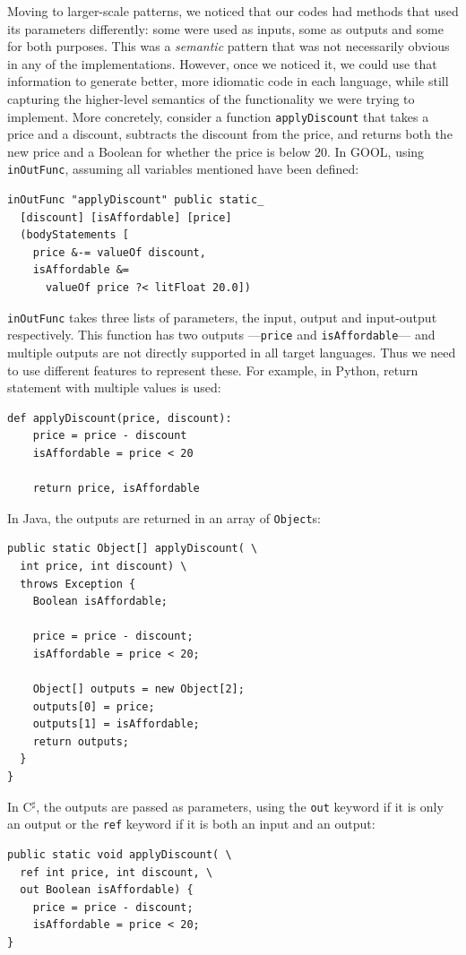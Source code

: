 \documentclass[sigplan,review,anonymous,prologue,dvipsnames]{acmart}
\newcommand{\Csharp}{C$^{\sharp}$}
\begin{document}
Moving to larger-scale patterns, we noticed that our codes had methods that
used its parameters differently: some were used as inputs, some as outputs
and some for both purposes.  This was a \emph{semantic} pattern that was
not necessarily obvious in any of the implementations. However, once we noticed it,
we could use that information to generate better, more idiomatic code in
each language, while still capturing the higher-level semantics of the
functionality we were trying to implement.  More concretely, consider a
function \verb|applyDiscount| that takes a price and a discount, subtracts the
discount from the price, and returns both the new price and a Boolean for
whether the price is below $20$. In GOOL, using \verb|inOutFunc|, assuming
all variables mentioned have been defined:
\begin{lstlisting}
inOutFunc "applyDiscount" public static_
  [discount] [isAffordable] [price]
  (bodyStatements [
    price &-= valueOf discount,
    isAffordable &=
      valueOf price ?< litFloat 20.0])
\end{lstlisting}
\verb|inOutFunc| takes three lists of parameters, the input, output and
input-output respectively.  This function has two outputs
---\verb|price| and \verb|isAffordable|--- and multiple outputs are
not directly supported in all target languages.  Thus we need to use
different features to represent these.  For example, in Python,
return statement with multiple values is used:
\begin{lstlisting}
def applyDiscount(price, discount):
    price = price - discount
    isAffordable = price < 20

    return price, isAffordable
\end{lstlisting}
In Java, the outputs are returned in an array of \verb|Object|s:
\begin{lstlisting}
public static Object[] applyDiscount( \
  int price, int discount) \
  throws Exception {
    Boolean isAffordable;

    price = price - discount;
    isAffordable = price < 20;

    Object[] outputs = new Object[2];
    outputs[0] = price;
    outputs[1] = isAffordable;
    return outputs;
  }
}
\end{lstlisting}
In \Csharp, the outputs are passed as parameters, using the \verb|out| keyword if
it is only an output or the \verb|ref| keyword if it is both an input and an
output:
\begin{lstlisting}
public static void applyDiscount( \
  ref int price, int discount, \
  out Boolean isAffordable) {
    price = price - discount;
    isAffordable = price < 20;
}
\end{lstlisting}
\end{document}
